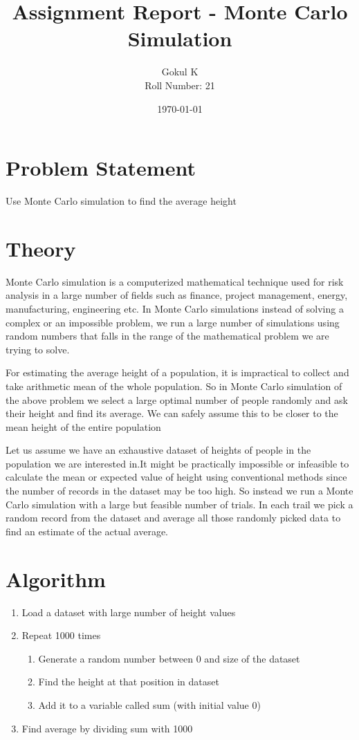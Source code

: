 \documentclass{article}
\begin{document}
\title{Assignment Report - Monte Carlo Simulation}
\author{Gokul K\\[2\baselineskip]
Roll Number: 21\\[2\baselineskip]}
\date{\today}

\maketitle

\large
\section{Problem Statement}
Use Monte Carlo simulation to find the average height

\section{Theory}
Monte Carlo simulation is a computerized mathematical technique
used for risk analysis in a large number of fields such as finance,
project management, energy, manufacturing, engineering etc. In Monte  
Carlo simulations instead of solving a complex or an impossible problem,
we run a large number of simulations using random numbers that falls in
the range of the mathematical problem we are trying to solve.

For estimating the average height of a population, it is impractical
to collect and take arithmetic mean of the whole population. So in 
Monte Carlo simulation of the above problem we select a large optimal number 
of people randomly and ask their height and find its average. We can safely 
assume this to be closer to the mean height of the entire population

Let us assume we have an exhaustive dataset of heights of people in the population 
we are interested in.It might be practically impossible or infeasible to calculate 
the mean or expected value of height using conventional methods since the number of 
records in the dataset may be too high. So instead we run a Monte Carlo simulation 
with a large but  feasible number of trials. In each trail we pick a random record from 
the dataset and average all those randomly picked data to find an estimate of the 
actual average.

\section{Algorithm}
\begin{enumerate}
    \item Load a dataset with large number of height values
    \item Repeat 1000 times
    \begin{enumerate}
        \item Generate a random number between 0 and size of the dataset
        \item Find the height at that position in dataset
        \item Add it to a variable called sum (with initial value 0)
    \end{enumerate}
    \item Find average by dividing sum with 1000
\end{enumerate}
\end{document}

